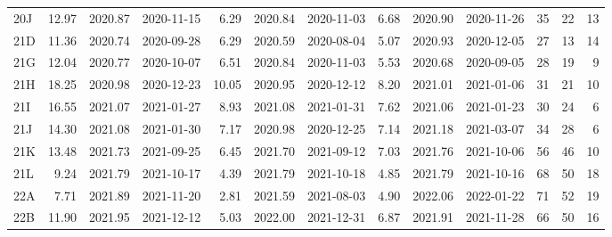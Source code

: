 \begin{tabular}{lrrlrrlrrlrrr}
  20J &     12.97 &     2020.87 &      2020-11-15 &     6.29 &    2020.84 &     2020-11-03 &      6.68 &     2020.90 &      2020-11-26 &       35 &      22 &       13 \\
  21D &     11.36 &     2020.74 &      2020-09-28 &     6.29 &    2020.59 &     2020-08-04 &      5.07 &     2020.93 &      2020-12-05 &       27 &      13 &       14 \\
  21G &     12.04 &     2020.77 &      2020-10-07 &     6.51 &    2020.84 &     2020-11-03 &      5.53 &     2020.68 &      2020-09-05 &       28 &      19 &        9 \\
  21H &     18.25 &     2020.98 &      2020-12-23 &    10.05 &    2020.95 &     2020-12-12 &      8.20 &     2021.01 &      2021-01-06 &       31 &      21 &       10 \\
  21I &     16.55 &     2021.07 &      2021-01-27 &     8.93 &    2021.08 &     2021-01-31 &      7.62 &     2021.06 &      2021-01-23 &       30 &      24 &        6 \\
  21J &     14.30 &     2021.08 &      2021-01-30 &     7.17 &    2020.98 &     2020-12-25 &      7.14 &     2021.18 &      2021-03-07 &       34 &      28 &        6 \\
  21K &     13.48 &     2021.73 &      2021-09-25 &     6.45 &    2021.70 &     2021-09-12 &      7.03 &     2021.76 &      2021-10-06 &       56 &      46 &       10 \\
  21L &      9.24 &     2021.79 &      2021-10-17 &     4.39 &    2021.79 &     2021-10-18 &      4.85 &     2021.79 &      2021-10-16 &       68 &      50 &       18 \\
  22A &      7.71 &     2021.89 &      2021-11-20 &     2.81 &    2021.59 &     2021-08-03 &      4.90 &     2022.06 &      2022-01-22 &       71 &      52 &       19 \\
  22B &     11.90 &     2021.95 &      2021-12-12 &     5.03 &    2022.00 &     2021-12-31 &      6.87 &     2021.91 &      2021-11-28 &       66 &      50 &       16 \\
\bottomrule
\end{tabular}
